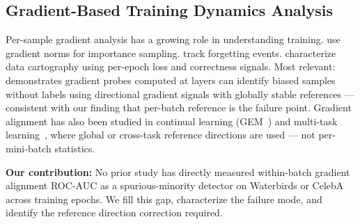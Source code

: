 \subsection{Gradient-Based Training Dynamics Analysis}

Per-sample gradient analysis has a growing role in understanding training.
\citet{Katharopoulos2018Not} use gradient norms for importance sampling.
\citet{Toneva2019Empirical} track forgetting events.
\citet{Swayamdipta2020Dataset} characterize data cartography using per-epoch loss and correctness signals.
Most relevant: \citet{BiasTrail2025Bias} demonstrates gradient probes computed at layers can identify biased samples without labels using directional gradient signals with globally stable references --- consistent with our finding that per-batch reference is the failure point.
Gradient alignment has also been studied in continual learning (GEM~\citep{LopezPaz2017Gradient}) and multi-task learning~\citep{Yu2020Gradient}, where global or cross-task reference directions are used --- not per-mini-batch statistics.

\textbf{Our contribution:} No prior study has directly measured within-batch gradient alignment ROC-AUC as a spurious-minority detector on Waterbirds or CelebA across training epochs.
We fill this gap, characterize the failure mode, and identify the reference direction correction required.
